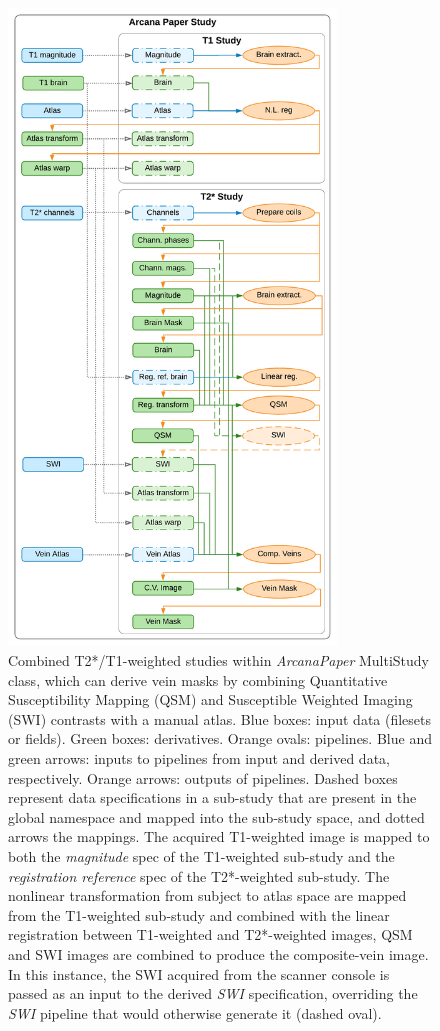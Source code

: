 \documentclass[smallextended]{svjour3}       %
\begin{document}
\begin{figure}
	\centering
    \includegraphics[width=0.775\textwidth]{../figures/t2star_t1_study}
  \caption{Combined T2*/T1-weighted studies within \emph{ArcanaPaper}
  MultiStudy class, which can derive vein masks by combining Quantitative Susceptibility
Mapping (QSM) and Susceptible Weighted Imaging (SWI) contrasts with a
manual atlas. Blue boxes: input data (filesets or fields).
Green boxes: derivatives. Orange ovals: pipelines. Blue and green
arrows: inputs to pipelines from input and derived data, respectively. Orange
arrows: outputs of pipelines. Dashed boxes represent data specifications
in a sub-study that are present in the global namespace and mapped into
the sub-study space, and dotted arrows the mappings. The acquired
T1-weighted image is mapped to both the \emph{magnitude} spec of the
T1-weighted sub-study and the \emph{registration reference} spec of the
T2*-weighted sub-study. The nonlinear transformation from subject to
atlas space are mapped from the T1-weighted sub-study and combined with
the linear registration between T1-weighted and T2*-weighted images, QSM
and SWI images are combined to produce the composite-vein image. In this
instance, the SWI acquired from the scanner console is passed
as an input to the derived \emph{SWI} specification, overriding the
\emph{SWI} pipeline that would otherwise generate it (dashed oval).}
\label{fig:t2star_t1_study}
\end{figure} 
\end{document}
